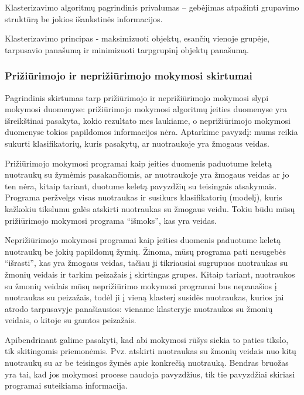 Klasterizavimo algoritmų pagrindinis privalumas – gebėjimas atpažinti grupavimo
struktūrą be jokios išankstinės informacijos.  

Klasterizavimo principas - maksimizuoti objektų, esančių vienoje grupėje,
tarpusavio panašumą ir minimizuoti tarpgrupinį objektų panašumą.

\subsubsection{Prižiūrimojo ir neprižiūrimojo mokymosi skirtumai}
Pagrindinis skirtumas tarp prižiūrimojo ir neprižiūrimojo mokymosi slypi
mokymosi duomenyse: prižiūrimojo mokymosi algoritmų įeities duomenyse yra
išreikštinai pasakyta, kokio rezultato mes laukiame, o neprižiūrimojo mokymosi duomenyse tokios
papildomos informacijos nėra. Aptarkime pavyzdį: mums reikia sukurti
klasifikatorių, kuris pasakytų, ar nuotraukoje yra žmogaus veidas. 

Prižiūrimojo mokymosi programai kaip įeities duomenis paduotume keletą 
nuotraukų su žymėmis pasakančiomis, ar nuotraukoje yra žmogaus veidas ar jo ten
nėra, kitaip tariant, duotume keletą pavyzdžių su teisingais atsakymais.
Programa peržvelgs visas nuotraukas ir susikurs klasifikatorių (modelį), kuris
kažkokiu tikslumu galės atskirti nuotraukas su žmogaus veidu. Tokiu būdu mūsų
prižiūrimojo mokymosi programa ``išmoks'', kas yra veidas.

Neprižiūrimojo mokymosi programai kaip įeities duomenis paduotume keletą
nuotraukų be jokių papildomų žymių. Žinoma, mūsų programa pati nesugebės
``išrasti'', kas yra žmogaus veidas, tačiau ji tikriausiai sugrupuos nuotraukas
su žmonių veidais ir tarkim peizažais į skirtingas grupes. Kitaip tariant,
nuotraukos su žmonių veidais mūsų neprižiūrimo mokymosi programai bus nepanašios
į nuotraukas su peizažais, todėl ji į vieną klasterį susidės nuotraukas, kurios
jai atrodo tarpusavyje panašiausios: viename klasteryje nuotraukos su žmonių
veidais, o kitoje su gamtos peizažais.

Apibendrinant galime pasakyti, kad abi mokymosi rūšys siekia to paties tikslo,
tik skitingomis priemonėmis. Pvz. atskirti nuotraukas su žmonių
veidais nuo kitų nuotraukų su ar be teisingos žymės apie konkrečią nuotrauką.
Bendras bruožas yra tai, kad jos mokymosi procese naudoja pavyzdžius, tik tie pavyzdžiai 
skiriasi programai suteikiama informacija. %




